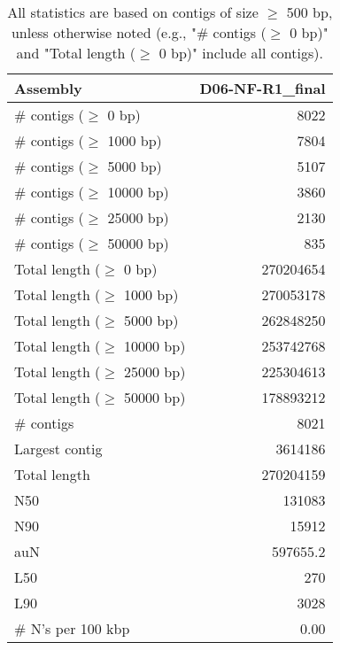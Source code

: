 \documentclass[12pt,a4paper]{article}
\begin{document}
\begin{table}[ht]
\begin{center}
\caption{All statistics are based on contigs of size $\geq$ 500 bp, unless otherwise noted (e.g., "\# contigs ($\geq$ 0 bp)" and "Total length ($\geq$ 0 bp)" include all contigs).}
\begin{tabular}{|l*{1}{|r}|}
\hline
Assembly & D06-NF-R1\_final \\ \hline
\# contigs ($\geq$ 0 bp) & 8022 \\ \hline
\# contigs ($\geq$ 1000 bp) & 7804 \\ \hline
\# contigs ($\geq$ 5000 bp) & 5107 \\ \hline
\# contigs ($\geq$ 10000 bp) & 3860 \\ \hline
\# contigs ($\geq$ 25000 bp) & 2130 \\ \hline
\# contigs ($\geq$ 50000 bp) & 835 \\ \hline
Total length ($\geq$ 0 bp) & 270204654 \\ \hline
Total length ($\geq$ 1000 bp) & 270053178 \\ \hline
Total length ($\geq$ 5000 bp) & 262848250 \\ \hline
Total length ($\geq$ 10000 bp) & 253742768 \\ \hline
Total length ($\geq$ 25000 bp) & 225304613 \\ \hline
Total length ($\geq$ 50000 bp) & 178893212 \\ \hline
\# contigs & 8021 \\ \hline
Largest contig & 3614186 \\ \hline
Total length & 270204159 \\ \hline
N50 & 131083 \\ \hline
N90 & 15912 \\ \hline
auN & 597655.2 \\ \hline
L50 & 270 \\ \hline
L90 & 3028 \\ \hline
\# N's per 100 kbp & 0.00 \\ \hline
\end{tabular}
\end{center}
\end{table}
\end{document}
